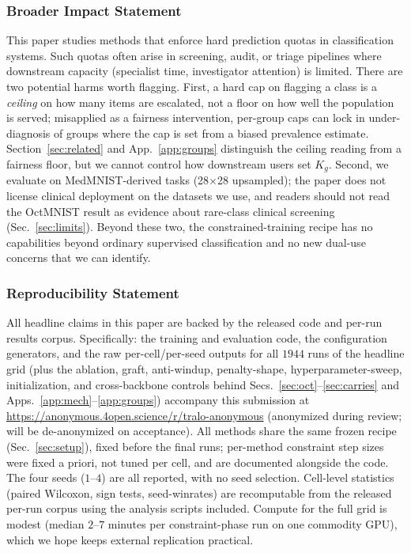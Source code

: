 \documentclass[10pt]{article}
\begin{document}
\subsubsection*{Broader Impact Statement}
This paper studies methods that enforce hard prediction quotas in
classification systems. Such quotas often arise in screening, audit, or
triage pipelines where downstream capacity (specialist time, investigator
attention) is limited. There are two potential harms worth flagging.
First, a hard cap on flagging a class is a \emph{ceiling} on how many
items are escalated, not a floor on how well the population is served;
misapplied as a fairness intervention, per-group caps can lock in
under-diagnosis of groups where the cap is set from a biased prevalence
estimate. Section~\ref{sec:related} and App.~\ref{app:groups} distinguish
the ceiling reading from a fairness floor, but we cannot control how
downstream users set $K_g$. Second, we evaluate on MedMNIST-derived
tasks (28$\times$28 upsampled); the paper does not license clinical
deployment on the datasets we use, and readers should not read the
OctMNIST result as evidence about rare-class clinical screening
(Sec.~\ref{sec:limits}). Beyond these two, the constrained-training
recipe has no capabilities beyond ordinary supervised classification and
no new dual-use concerns that we can identify.

\subsubsection*{Reproducibility Statement}
All headline claims in this paper are backed by the released code and
per-run results corpus. Specifically: the training and evaluation code,
the configuration generators, and the raw per-cell/per-seed outputs for
all $1944$ runs of the headline grid (plus the ablation, graft,
anti-windup, penalty-shape, hyperparameter-sweep, initialization, and
cross-backbone controls behind
Secs.~\ref{sec:oct}--\ref{sec:carries} and Apps.~\ref{app:mech}--\ref{app:groups})
accompany this submission at
\url{https://anonymous.4open.science/r/tralo-anonymous}
(anonymized during review; will be de-anonymized on acceptance). All
methods share the same frozen recipe (Sec.~\ref{sec:setup}), fixed before
the final runs; per-method constraint step sizes were fixed a priori, not
tuned per cell, and are documented alongside the code. The four seeds
($1$--$4$) are all reported, with no seed selection. Cell-level statistics (paired Wilcoxon, sign tests,
seed-winrates) are recomputable from the released per-run corpus using
the analysis scripts included. Compute for the full grid is modest
(median $2$--$7$ minutes per constraint-phase run on one commodity GPU),
which we hope keeps external replication practical.
\end{document}
